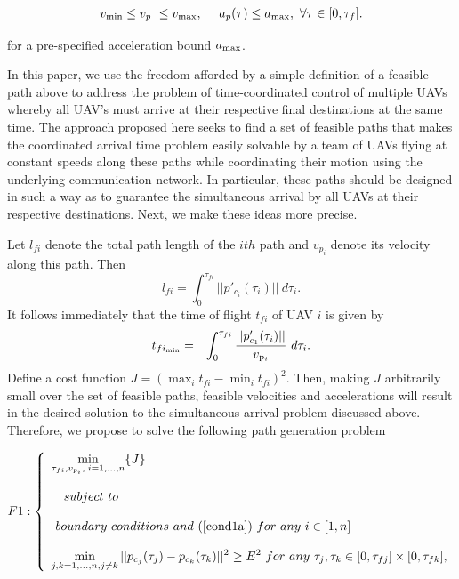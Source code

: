 \documentclass[]{aiaa-tc}%
\begin{document}
\begin{eqnarray} \label{cond1a}
v_{\rm min} \le v_p ~ \le v_{\rm max}, ~~~~ a_p(\tau) \le a_{\rm max},
~ \forall \tau \in [0,\tau_f].
\end{eqnarray}

\noindent for a pre-specified acceleration bound $a_{\rm max}$.

In this paper, we use the freedom afforded by a simple definition of a feasible path above to address the problem of
time-coordinated control of multiple UAVs whereby all UAV's must arrive at their
respective final destinations at the same time.  The approach proposed here seeks to find a set of feasible paths that makes the coordinated arrival time problem easily solvable by a team of UAVs flying at constant speeds along these paths while coordinating their motion using the underlying communication network. In particular, these paths should be designed in such a way as to guarantee the simultaneous arrival by all UAVs at their respective destinations. Next, we make these ideas more precise.

Let $l_{fi}$ denote the total path length of the $ith$ path and
$v_{p_i}$ denote its velocity along this path. Then
$$
l_{fi}=\int^{\tau_{fi}}_0 ||p'_{c_i}(\tau_i)|| ~ d \tau_i.
$$
It follows immediately that the time of flight $t_{fi}$ of UAV $i$ is given by
\begin{eqnarray} \nonumber t_{fi_{{\rm min}}} &=&
\int^{\tau_{fi}}_0 \frac{||p'_{c_1}(\tau_i)||} {v_{{\rm p}_{i}}}~ d \tau_i .
\end{eqnarray}
Define a cost function $J = (\max_i t_{fi} - \min_i t_{fi})^2$. Then, making $J$ arbitrarily small over the set of feasible paths, feasible velocities and accelerations  will
result in the desired solution to the simultaneous arrival problem
discussed above. Therefore, we propose to solve the following
path generation problem

\begin{eqnarray}
F1: \left\{
\begin{array}{llll}
\displaystyle{\min_{\tau_{fi},v_{p_i}, \; i =1,\ldots,n} \{ J  \} } \\ \\
~~ ~ subject ~
to \\ \\
~ boundary ~ conditions ~ and ~(\ref{cond1a}) ~ for~ any ~ i
\in [1,n] \\ \\
\displaystyle{\min_{j,k = 1, \ldots, n, j \ne k} ||
p_{c_j}(\tau_j) - p_{c_k}(\tau_k)||^2 \ge E^2 ~ for ~ any ~
\tau_j, \tau_k \in [0,
\tau_{fj}] \times [0, \tau_{fk}]},
\end{array} \right.
\end{eqnarray}
\end{document}
